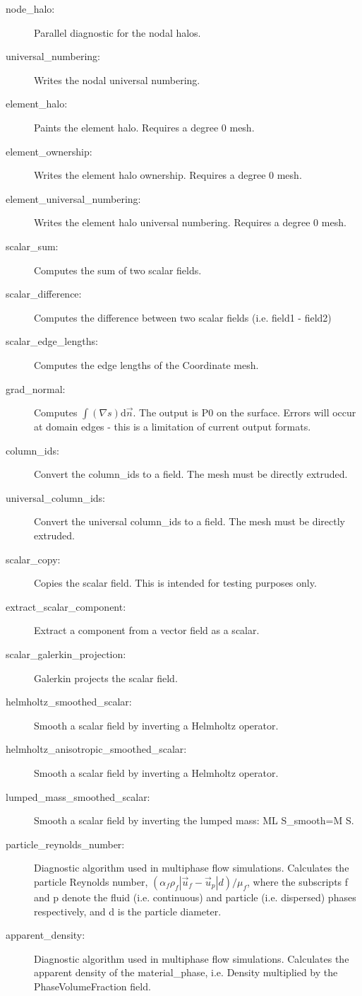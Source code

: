 \begin{description}
\item[node\_halo:]Parallel diagnostic for the nodal halos.
\item[universal\_numbering:]Writes the nodal universal numbering.
\item[element\_halo:]Paints the element halo. Requires a degree 0 mesh.
\item[element\_ownership:]Writes the element halo ownership. Requires a degree 0 mesh.
\item[element\_universal\_numbering:]Writes the element halo universal numbering. Requires a degree 0 mesh.
\item[scalar\_sum:]Computes the sum of two scalar fields.
\item[scalar\_difference:]Computes the difference between two scalar fields (i.e. field1 - field2)
\item[scalar\_edge\_lengths:]Computes the edge lengths of the Coordinate mesh.
\item[grad\_normal:]Computes $\int{(\nabla s) \mathrm{d}\vec{n}}$. The output is P0 on the surface. Errors will occur at domain edges - this is a limitation of current output formats.
\item[column\_ids:] Convert the column\_ids to a field. The mesh must be directly extruded.
\item[universal\_column\_ids:]Convert the universal column\_ids to a field. The mesh must be directly extruded.
\item[scalar\_copy:]Copies the scalar field. This is intended for testing purposes only.
\item[extract\_scalar\_component:]Extract a component from a vector field as a scalar.
\item[scalar\_galerkin\_projection:]Galerkin projects the scalar field.
\item[helmholtz\_smoothed\_scalar:]Smooth a scalar field by inverting a Helmholtz operator.
\item[helmholtz\_anisotropic\_smoothed\_scalar:]Smooth a scalar field by inverting a Helmholtz operator.
\item[lumped\_mass\_smoothed\_scalar:]Smooth a scalar field by inverting the lumped mass: ML {S\_smooth}=M {S}.
\item[particle\_reynolds\_number:]Diagnostic algorithm used in multiphase flow simulations. Calculates the particle Reynolds number, $(\alpha_f\rho_f|\vec{u}_f - \vec{u}_p|d)/\mu_f$, where the subscripts f and p denote the fluid (i.e. continuous) and particle (i.e. dispersed) phases respectively, and d is the particle diameter.
\item[apparent\_density:]Diagnostic algorithm used in multiphase flow simulations. Calculates the apparent density of the material\_phase, i.e. Density multiplied by the PhaseVolumeFraction field.
\end{description}        


